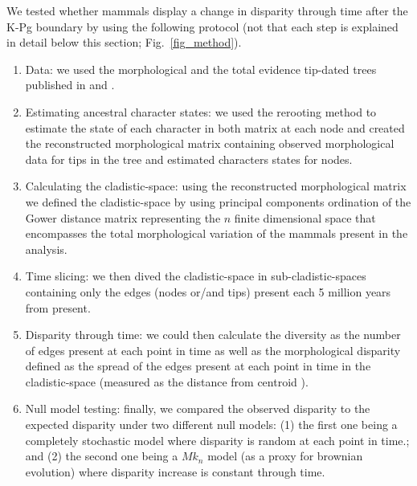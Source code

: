 \documentclass[12pt,letterpaper]{article}
\begin{document}
We tested whether mammals display a change in disparity through time after the K-Pg boundary by using the following protocol (not that each step is explained in detail below this section; Fig.~\ref{fig_method}).
\begin{enumerate}
\item{Data: we used the morphological and the total evidence tip-dated trees published in \cite{MEE3:MEE312084} and \cite{beckancient2014}.} \\
\item{Estimating ancestral character states: we used the \cite{Yang01121995} rerooting method to estimate the state of each character in both matrix at each node and created the reconstructed morphological matrix containing observed morphological data for tips in the tree and estimated characters states for nodes.}\\
\item{Calculating the cladistic-space: using the reconstructed morphological matrix we defined the cladistic-space by using principal components ordination of the Gower distance matrix \cite{Gower71} representing the $n$ finite dimensional space that encompasses the total morphological variation of the mammals present in the analysis.} \\
\item{Time slicing: we then dived the cladistic-space in sub-cladistic-spaces containing only the edges (nodes or/and tips) present each 5 million years from present.} \\
\item{Disparity through time: we could then calculate the diversity as the number of edges present at each point in time as well as the morphological disparity defined as the spread of the edges present at each point in time in the cladistic-space (measured as the distance from centroid \cite{finlay2015morphological}).} \\
\item{Null model testing: finally, we compared the observed disparity to the expected disparity under two different null models: (1) the first one being a completely stochastic model where disparity is random at each point in time.; and (2) the second one being a $Mk_n$ model (as a proxy for brownian evolution) where disparity increase is constant through time.} \\
\end{enumerate}
\end{document}
